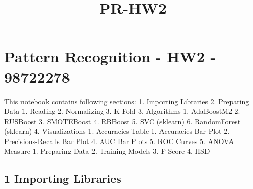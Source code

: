 \documentclass[11pt]{article}
\title{PR-HW2}
\begin{document}
    
    
    \maketitle
    
    

    
    \hypertarget{pattern-recognition---hw2---98722278}{%
\section{Pattern Recognition - HW2 -
98722278}\label{pattern-recognition---hw2---98722278}}

This notebook contains following sections: 1. Importing Libraries 2.
Preparing Data 1. Reading 2. Normalizing 3. K-Fold 3. Algorithms 1.
AdaBoostM2 2. RUSBoost 3. SMOTEBoost 4. RBBoost 5. SVC (sklearn) 6.
RandomForest (sklearn) 4. Visualizations 1. Accuracies Table 1.
Accuracies Bar Plot 2. Precisions-Recalls Bar Plot 4. AUC Bar Plots 5.
ROC Curves 5. ANOVA Measure 1. Preparing Data 2. Training Models 3.
F-Score 4. HSD

    \hypertarget{importing-libraries}{%
\subsection{1 Importing Libraries}\label{importing-libraries}}
\end{document}
